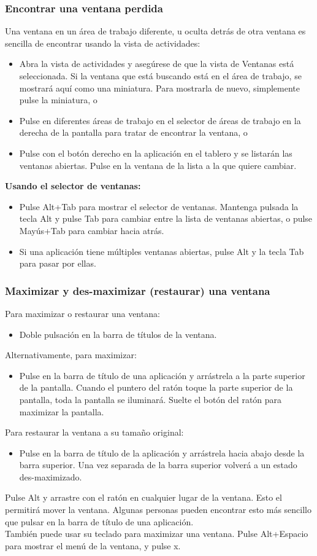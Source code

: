 \subsubsection{Encontrar una ventana perdida}
Una ventana en un área de trabajo diferente, u oculta detrás de otra ventana es sencilla de encontrar usando la vista de actividades:
\begin{itemize}
\item Abra la vista de actividades y asegúrese de que la vista de Ventanas está seleccionada. Si la ventana que está buscando está en el área de trabajo, se mostrará aquí como una miniatura. Para mostrarla de nuevo, simplemente pulse la miniatura, o
\item Pulse en diferentes áreas de trabajo en el selector de áreas de trabajo en la derecha de la pantalla para tratar de encontrar la ventana, o
\item Pulse con el botón derecho en la aplicación en el tablero y se listarán las ventanas abiertas. Pulse en la ventana de la lista a la que quiere cambiar.
\end{itemize}

{\bf Usando el selector de ventanas:}
\begin{itemize}
\item Pulse Alt+Tab para mostrar el selector de ventanas. Mantenga pulsada la tecla Alt y pulse Tab para cambiar entre la lista de ventanas abiertas, o pulse Mayús+Tab para cambiar hacia atrás.
\item Si una aplicación tiene múltiples ventanas abiertas, pulse Alt y la tecla Tab para pasar por ellas.
\end{itemize}
\subsubsection{Maximizar y des-maximizar (restaurar) una ventana}
Para maximizar o restaurar una ventana:
\begin{itemize}
\item Doble pulsación en la barra de títulos de la ventana.
\end{itemize}
Alternativamente, para maximizar:
\begin{itemize}
\item Pulse en la barra de título de una aplicación y arrástrela a la parte superior de la pantalla. Cuando el puntero del ratón toque la parte superior de la pantalla, toda la pantalla se iluminará. Suelte el botón del ratón para maximizar la pantalla.
\end{itemize}
Para restaurar la ventana a su tamaño original:
\begin{itemize}
\item Pulse en la barra de título de la aplicación y arrástrela hacia abajo desde la barra superior. Una vez separada de la barra superior volverá a un estado des-maximizado.
\end{itemize}
Pulse Alt y arrastre con el ratón en cualquier lugar de la ventana. Esto el permitirá mover la ventana. Algunas personas pueden encontrar esto más sencillo que pulsar en la barra de título de una aplicación.\\
También puede usar su teclado para maximizar una ventana. Pulse Alt+Espacio para mostrar el menú de la ventana, y pulse x.
